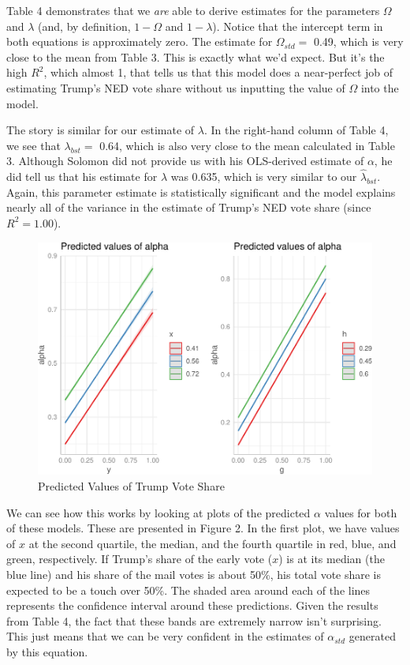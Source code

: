\documentclass[12pt]{article}
\begin{document}
Table 4 demonstrates that we \emph{are} able to derive estimates for the parameters \(\Omega\) and \(\lambda\) (and, by definition, \(1-\Omega\) and \(1-\lambda\)). Notice that the intercept term in both equations is approximately zero. The estimate for \(\Omega_{std}=\) 0.49, which is very close to the mean from Table 3. This is exactly what we'd expect. But it's the high \(R^2\), which almost 1, that tells us that this model does a near-perfect job of estimating Trump's NED vote share without us inputting the value of \(\Omega\) into the model.

The story is similar for our estimate of \(\lambda\). In the right-hand column of Table 4, we see that \(\lambda_{bst}=\) 0.64, which is also very close to the mean calculated in Table 3. Although Solomon did not provide us with his OLS-derived estimate of \(\alpha\), he did tell us that his estimate for \(\lambda\) was 0.635, which is very similar to our \(\hat{\lambda}_{bst}\). Again, this parameter estimate is statistically significant and the model explains nearly all of the variance in the estimate of Trump's NED vote share (since \(R^2=1.00\)).

\begin{figure}
\centering
\includegraphics{Report_files/figure-latex/figz2-1.pdf}
\caption{\label{fig:figz2}Predicted Values of Trump Vote Share}
\end{figure}

We can see how this works by looking at plots of the predicted \(\alpha\) values for both of these models. These are presented in Figure 2. In the first plot, we have values of \(x\) at the second quartile, the median, and the fourth quartile in red, blue, and green, respectively. If Trump's share of the early vote (\(x\)) is at its median (the blue line) and his share of the mail votes is about 50\%, his total vote share is expected to be a touch over 50\%. The shaded area around each of the lines represents the confidence interval around these predictions. Given the results from Table 4, the fact that these bands are extremely narrow isn't surprising. This just means that we can be very confident in the estimates of \(\alpha_{std}\) generated by this equation.
\end{document}
